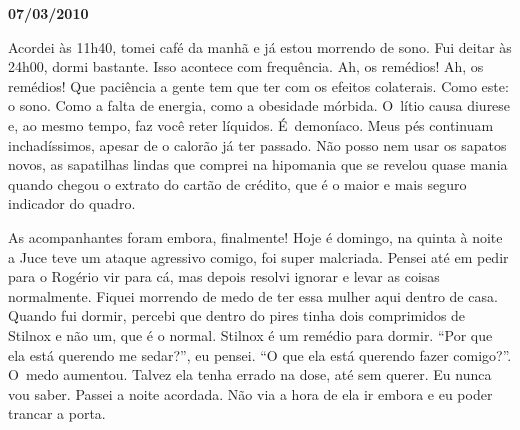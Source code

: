 \begin{center}\textbf{\asterisc{}}\end{center}


\begin{flushright}\textbf{07/03/2010}\end{flushright}


Acordei às 11h40, tomei café da manhã e já estou morrendo de sono. Fui
deitar às 24h00, dormi bastante. Isso acontece com frequência. Ah, os
remédios! Ah, os remédios! Que paciência a gente tem que ter com os
efeitos colaterais. Como este: o sono. Como a falta de energia, como a
obesidade mórbida. O~lítio causa diurese e, ao mesmo tempo, faz você
reter líquidos. É~demoníaco. Meus pés continuam inchadíssimos, apesar de
o calorão já ter passado. Não posso nem usar os sapatos novos, as
sapatilhas lindas que comprei na hipomania que se revelou quase mania
quando chegou o extrato do cartão de crédito, que é o maior e mais
seguro indicador do quadro.

As acompanhantes foram embora, finalmente! Hoje é domingo, na quinta à
noite a Juce teve um ataque agressivo comigo, foi super malcriada.
Pensei até em pedir para o Rogério vir para cá, mas depois resolvi
ignorar e levar as coisas normalmente. Fiquei morrendo de medo de
ter essa mulher aqui dentro de casa. Quando fui dormir, percebi que
dentro do pires tinha dois comprimidos de Stilnox e não um, que é o
normal. Stilnox é um remédio para dormir. ``Por que ela está querendo me
sedar?'', eu pensei. ``O que ela está querendo fazer comigo?''. O~medo
aumentou. Talvez ela tenha errado na dose, até sem querer. Eu nunca vou
saber. Passei a noite acordada. Não via a hora de ela ir embora e eu
poder trancar a porta.

